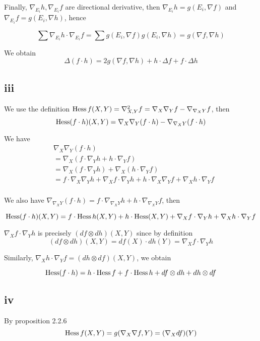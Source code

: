 Finally, $\nabla_{E_i} h, \nabla_{E_i} f$ are directional derivative, then $\nabla_{E_i} h = g(E_i, \nabla f)$ and $\nabla_{E_i} f = g(E_i, \nabla h)$, hence

$$
	\sum \nabla_{E_i} h \cdot \nabla_{E_i} f = \sum g(E_i, \nabla f) g(E_i, \nabla h) = g(\nabla f, \nabla h)
$$

We obtain
$$
	\Delta (f \cdot h) = 2 g(\nabla f, \nabla h) + h \cdot \Delta f + f \cdot \Delta h
$$


\subsection{iii}

We use the definition $\operatorname{Hess} f(X, Y) = \nabla^2_{X, Y} f = \nabla_X \nabla_Y f - \nabla_{\nabla_X Y} f$, then
$$
	\operatorname{Hess} (f \cdot h)(X, Y) = \nabla_X \nabla_Y (f \cdot h) -  \nabla_{\nabla_X Y} (f \cdot h)
$$

We have 
\begin{align*}
	& \nabla_X \nabla_Y (f \cdot h)\\
	&= \nabla_X (f \cdot \nabla_Y h + h \cdot \nabla_Y f) \\
	&= \nabla_X (f \cdot \nabla_Y h) + \nabla_X(h \cdot \nabla_Y f) \\
	&=  f \cdot \nabla_X \nabla_Y h + \nabla_X f \cdot \nabla_Y h + h \cdot \nabla_X \nabla_Y f + \nabla_X h \cdot \nabla_Y f \\
\end{align*}

We also have $\nabla_{\nabla_X Y} (f \cdot h) =  f \cdot \nabla_{\nabla_X Y} h + h \cdot \nabla_{\nabla_X Y} f$, then

$$
	\operatorname{Hess} (f \cdot h)(X, Y) = f \cdot \operatorname{Hess} h(X, Y) + h \cdot \operatorname{Hess}(X, Y) +  \nabla_X f \cdot \nabla_Y h + \nabla_X h \cdot \nabla_Y f
$$

$\nabla_X f \cdot \nabla_Y h$ is precisely $(df \otimes dh)(X, Y)$ since by definition
$$
	(df \otimes dh)(X, Y) = df(X) \cdot dh(Y) = \nabla_X f \cdot \nabla_Y h
$$

Similarly, $ \nabla_X h \cdot \nabla_Y f = (dh \otimes df)(X, Y)$, we obtain

$$
	\operatorname{Hess} (f \cdot h) = h \cdot \operatorname{Hess} f + f \cdot \operatorname{Hess} h  + df \otimes dh + dh \otimes df
$$

\subsection{iv}

By proposition 2.2.6
$$
	\operatorname{Hess} f(X, Y) = g(\nabla_X \nabla f, Y) = (\nabla_X df)(Y)
$$

